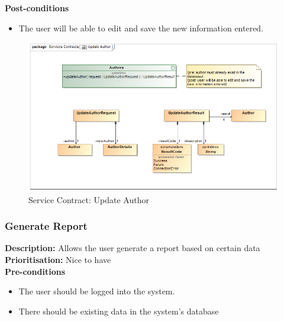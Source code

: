 \documentclass[a4paper]{article}
\begin{document}
	\textbf{Post-conditions}
	 \begin{itemize}
		\item The user will be able to edit and save the new information entered.
	\end{itemize}
	    	\begin{figure}[H]
	    		\centering
	    		\includegraphics[width=\textwidth]{5.1.16.Update.Author.Services.Contract.png}
	    		\caption{Service Contract: Update Author}
	    	\end{figure}
	
    \pagebreak
    \subsubsection{Generate Report}
	\textbf{Description:} Allows the user generate a report based on certain data\\
	\textbf{Prioritisation:} Nice to have\\
	
	\textbf{Pre-conditions}
	 \begin{itemize}
		\item The user should be logged into the system.
		\item There should be existing data in the system's database
 	\end{itemize}
	
\end{document}
